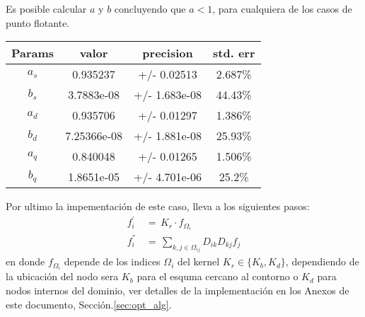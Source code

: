 \documentclass[9pt,technote,twoside,letterpaper,onecolumn]{IEEEtran}
\begin{document}
\begin{multicols}{2}
Es posible calcular $a$ y $b$ concluyendo que $a<1$, para cualquiera de los casos de punto flotante.
\begin{center}\scriptsize
\begin{tabular}{ |c|c|c|c| } 
  \hline
  Params & valor & precision & std. err \\
  \hline 
  $a_s$& 0.935237&+/- 0.02513&2.687\%\\
  $b_s$& 3.7883e-08&+/- 1.683e-08&44.43\%\\  \hline
  $a_d$& 0.935706&+/- 0.01297&1.386\%\\
  $b_d$& 7.25366e-08&+/- 1.881e-08&25.93\%\\  \hline
  $a_q$& 0.840048&+/- 0.01265&1.506\%\\
  $b_q$&1.8651e-05&+/- 4.701e-06&25.2\%\\
  \hline
\end{tabular}
\end{center}

Por ultimo la impementación de este caso, lleva a los siguientes pasos:
\begin{align}
  f^{'}_i\,&=\,K_r\cdot f_{\Omega_i}\label{eq:buffdiff}\\
  f^{''}_i\,&=\,\sum_{k,j\in\Omega_{ij}}D_{ik}D_{kj} f_j\label{eq:optimDiff}
\end{align}
en donde $f_{\Omega_i}$ depende de los indices $\Omega_i$ del kernel $K_r\in\{K_b, K_d\}$, dependiendo de la ubicación del nodo sera $K_b$ para el esquma cercano al contorno o $K_d$ para nodos internos del dominio, ver detalles de la implementación en los Anexos de este documento, Sección.\ref{sec:opt_alg}.



\end{multicols}
\end{document}
